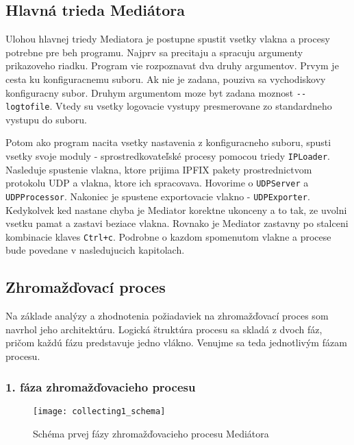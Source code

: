 
\subsection{Hlavná trieda Mediátora}


Ulohou hlavnej triedy Mediatora je postupne spustit vsetky vlakna a procesy potrebne pre beh programu.
Najprv sa precitaju a spracuju argumenty prikazoveho riadku. Program vie rozpoznavat dva druhy 
argumentov. Prvym je cesta ku konfiguracnemu suboru. Ak nie je zadana, pouziva sa vychodiskovy 
konfiguracny subor. Druhym argumentom moze byt zadana moznost \verb|--logtofile|. Vtedy su vsetky 
logovacie vystupy presmerovane zo standardneho vystupu do suboru.

Potom ako program nacita vsetky nastavenia z konfiguracneho suboru, spusti vsetky svoje moduly - 
sprostredkovateľské procesy pomocou triedy \verb|IPLoader|. Nasleduje spustenie vlakna, ktore prijima 
IPFIX pakety prostrednictvom protokolu UDP a vlakna, ktore ich spracovava. Hovorime o \verb|UDPServer| 
a \verb|UDPProcessor|. Nakoniec je spustene exportovacie vlakno - \verb|UDPExporter|. Kedykolvek ked 
nastane chyba je Mediator korektne ukonceny a to tak, ze uvolni vsetku pamat a zastavi beziace vlakna. 
Rovnako je Mediator zastavny po stalceni kombinacie klaves \verb|Ctrl+c|.
Podrobne o kazdom spomenutom vlakne a procese bude povedane v nasledujucich kapitolach.







\subsection{Zhromažďovací proces} \label{sec:collectingprocess}

Na základe analýzy a zhodnotenia požiadaviek na zhromažďovací proces som navrhol jeho architektúru.
Logická štruktúra procesu sa skladá z dvoch fáz, pričom každú fázu predstavuje jedno vlákno. 
Venujme sa teda jednotlivým fázam procesu.

\subsubsection{1. fáza zhromažďovacieho procesu}

\begin{figure}[ht!]
\centering
\texttt{[image: collecting1\_schema]}
\caption{Schéma prvej fázy zhromažďovacieho procesu Mediátora}\label{o:collecting1_schema}
\end{figure}

